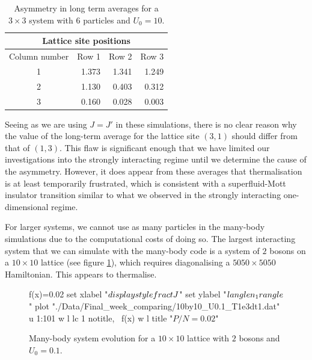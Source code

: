 \documentclass[a4paper, 10pt]{article}
\theoremstyle{plain}
\begin{document}
\begin{table}[H]
 \centering
 \begin{tabular}{c r r r}
  \hline
  \multicolumn{4}{c}{Lattice site positions}\\
  \hline
  Column number &     Row 1     &     Row 2     &     Row 3\\
  \hline
   1            &     1.373     &     1.341     &     1.249\\
   2            &     1.130     &     0.403     &     0.312\\
   3            &     0.160     &     0.028     &     0.003\\
   \hline
 \end{tabular}
 \caption{Asymmetry in long term averages for a $3\times3$ system with $6$ particles and
 $U_0=10$.}
 \label{table:stronginteractasymmetry}
\end{table}

Seeing as we are using $J=J'$ in these simulations, there is no clear reason
why the value of the long-term average for the lattice site $(3,1)$ should
differ from that of $(1,3)$. This flaw is significant enough that we have
limited our investigations into the strongly interacting regime until we
determine the cause of the asymmetry. However, it does appear from these
averages that thermalisation is at least temporarily frustrated, which is
consistent with a superfluid-Mott insulator transition similar to what we
observed in the strongly interacting one-dimensional regime.

For larger systems, we cannot use as many particles in the many-body simulations
due to the computational costs of doing so. The largest interacting system
that we can simulate with the many-body code is a system of $2$ bosons on
a $10\times10$ lattice (see figure \ref{10by10_analyticU0.1}),
which requires diagonalising a $5050\times5050$ Hamiltonian. This appears to
thermalise.

\begin{figure}[H]
    \centering
    \begin{gnuplot}[terminal=cairolatex, terminaloptions={lw 2}, scale=0.95]
	f(x)=0.02
        set xlabel "$\\displaystyle \\frac{t}{J}$"
        set ylabel "$\\langle n_{1} \\rangle$"
        plot "./Data/Final_week_comparing/10by10_U0.1_T1e3dt1.dat" u 1:101 w l lc 1 notitle, \
        f(x) w l title "$P/N=0.02$"
     \end{gnuplot}
     \vspace*{-5mm}
     \label{10by10_analyticU0.1}
     \caption{Many-body system evolution for a $10\times10$ lattice with $2$
     bosons and $U_0=0.1$.}
\end{figure}
\end{document}
